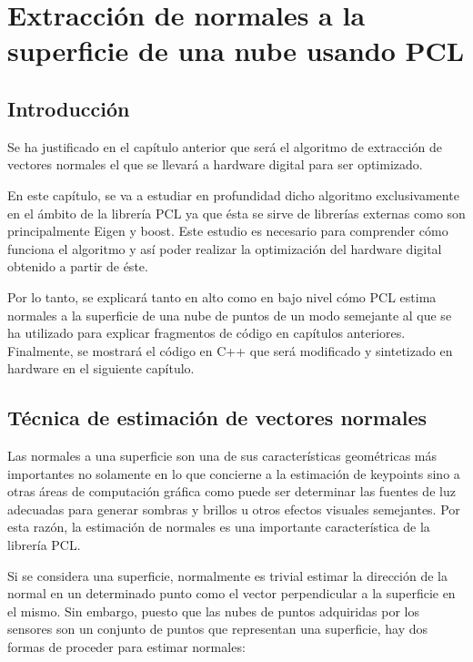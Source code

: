 \chapter{Extracción de normales a la superficie de una nube usando PCL}

\section{Introducción}
Se ha justificado en el capítulo anterior que será el algoritmo de extracción de vectores normales el que se llevará a hardware digital para ser optimizado. 

En este capítulo, se va a estudiar en profundidad dicho algoritmo exclusivamente en el ámbito de la librería PCL ya que ésta se sirve de librerías externas como son principalmente Eigen y boost. Este estudio es necesario para comprender cómo funciona el algoritmo y así poder realizar la optimización del hardware digital obtenido a partir de éste.

Por lo tanto, se explicará tanto en alto como en bajo nivel cómo PCL estima normales a la superficie de una nube de puntos de un modo semejante al que se ha utilizado para explicar fragmentos de código en capítulos anteriores. Finalmente, se mostrará el código en C++ que será modificado y sintetizado en hardware en el siguiente capítulo.


\section{Técnica de estimación de vectores normales}



Las normales a una superficie son una de sus características geométricas más importantes no solamente en lo que concierne a la estimación de keypoints sino a otras áreas de computación gráfica como puede ser determinar las fuentes de luz adecuadas para generar sombras y brillos u otros efectos visuales semejantes. Por esta razón, la estimación de normales es una importante característica de la librería PCL.

Si se considera una superficie, normalmente es trivial estimar la dirección de la normal en un determinado punto como el vector perpendicular a la superficie en el mismo. Sin embargo, puesto que las nubes de puntos adquiridas por los sensores son un conjunto de puntos que representan una superficie, hay dos formas de proceder para estimar normales:

